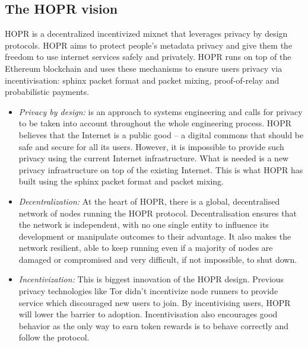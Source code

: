 \subsection{The HOPR vision}
HOPR is a decentralized incentivized mixnet that leverages privacy by design protocols. HOPR aims to protect people's metadata privacy and give them the freedom to use internet services safely and privately. HOPR runs on top of the Ethereum blockchain and uses these mechanisms to ensure users privacy via incentivisation: sphinx packet format and packet mixing, proof-of-relay and probabilistic payments.
\begin{itemize}
    \item \textit{Privacy by design:} is an approach to systems engineering and calls for privacy to be taken into account throughout the whole engineering process. HOPR believes that the Internet is a public good – a digital commons that should be safe and secure for all its users. However, it is impossible to provide such privacy using the current Internet infrastructure. What is needed is a new privacy infrastructure on top of the existing Internet. This is what HOPR has built using the sphinx packet format and packet mixing.
    \item \textit{Decentralization:} At the heart of HOPR, there is a global, decentralised network of nodes running the HOPR protocol. Decentralisation ensures that the network is independent, with no one single entity to influence its development or manipulate outcomes to their advantage. It also makes the network resilient, able to keep running even if a majority of nodes are damaged or compromised and very difficult, if not impossible, to shut down.
    \item \textit{Incentivization:} This is biggest innovation of the HOPR design. Previous privacy technologies like Tor didn't incentivize node runners to provide service which discouraged new users to join. By incentivising users, HOPR will lower the barrier to adoption. Incentivisation also encourages good behavior as the only way to earn token rewards is to behave correctly and follow the protocol.

\end{itemize}

